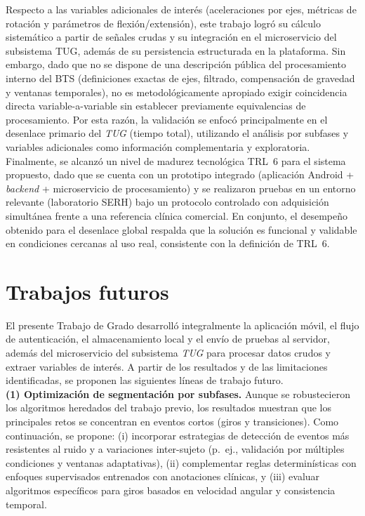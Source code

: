 \documentclass[12pt]{report}
\begin{document}
\begin{justify}
    Respecto a las variables adicionales de interés (aceleraciones por ejes, métricas de rotación y parámetros de flexión/extensión), este trabajo logró su cálculo sistemático a partir de señales crudas y su integración en el microservicio del subsistema TUG, además de su persistencia estructurada en la plataforma. Sin embargo, dado que no se dispone de una descripción pública del procesamiento interno del BTS (definiciones exactas de ejes, filtrado, compensación de gravedad y ventanas temporales), no es metodológicamente apropiado exigir coincidencia directa variable-a-variable sin establecer previamente equivalencias de procesamiento. Por esta razón, la validación se enfocó principalmente en el desenlace primario del \textit{TUG} (tiempo total), utilizando el análisis por subfases y variables adicionales como información complementaria y exploratoria.\\

    Finalmente, se alcanzó un nivel de madurez tecnológica TRL~6 para el sistema propuesto, dado que se cuenta con un prototipo integrado (aplicación Android + \textit{backend} + microservicio de procesamiento) y se realizaron pruebas en un entorno relevante (laboratorio SERH) bajo un protocolo controlado con adquisición simultánea frente a una referencia clínica comercial. En conjunto, el desempeño obtenido para el desenlace global respalda que la solución es funcional y validable en condiciones cercanas al uso real, consistente con la definición de TRL~6.

    \section{Trabajos futuros}

    El presente Trabajo de Grado desarrolló integralmente la aplicación móvil, el flujo de autenticación, el almacenamiento local y el envío de pruebas al servidor, además del microservicio del subsistema \textit{TUG} para procesar datos crudos y extraer variables de interés. A partir de los resultados y de las limitaciones identificadas, se proponen las siguientes líneas de trabajo futuro.\\

    \textbf{(1) Optimización de segmentación por subfases.}
    Aunque se robustecieron los algoritmos heredados del trabajo previo, los resultados muestran que los principales retos se concentran en eventos cortos (giros y transiciones). Como continuación, se propone: (i) incorporar estrategias de detección de eventos más resistentes al ruido y a variaciones inter-sujeto (p.\ ej., validación por múltiples condiciones y ventanas adaptativas), (ii) complementar reglas determinísticas con enfoques supervisados entrenados con anotaciones clínicas, y (iii) evaluar algoritmos específicos para giros basados en velocidad angular y consistencia temporal.\\


\end{justify}
\end{document}
